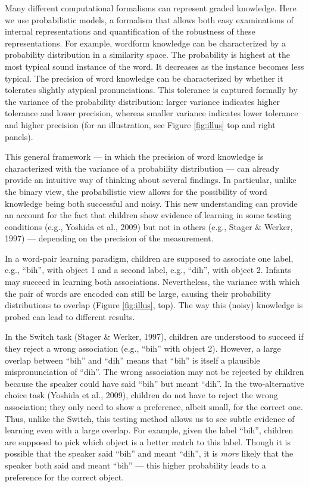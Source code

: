 \documentclass[english,,man]{apa6}
\begin{document}
Many different computational formalisms can represent graded knowledge. Here we use probabilistic models, a formalism that allows both easy examinations of internal representations and quantification of the robustness of these representations. For example, wordform knowledge can be characterized by a probability distribution in a similarity space. The probability is highest at the most typical sound instance of the word. It decreases as the instance becomes less typical. The precision of word knowledge can be characterized by whether it tolerates slightly atypical pronunciations. This tolerance is captured formally by the variance of the probability distribution: larger variance indicates higher tolerance and lower precision, whereas smaller variance indicates lower tolerance and higher precision (for an illustration, see Figure \ref{fig:illus} top and right panels).

This general framework --- in which the precision of word knowledge is characterized with the variance of a probability distribution --- can already provide an intuitive way of thinking about several findings. In particular, unlike the binary view, the probabilistic view allows for the possibility of word knowledge being both successful and noisy. This new understanding can provide an account for the fact that children show evidence of learning in some testing conditions (e.g., Yoshida et al., 2009) but not in others (e.g., Stager \& Werker, 1997) --- depending on the precision of the measurement.

In a word-pair learning paradigm, children are supposed to associate one label, e.g., \enquote{bih}, with object 1 and a second label, e.g., \enquote{dih}, with object 2. Infants may succeed in learning both associations. Nevertheless, the variance with which the pair of words are encoded can still be large, causing their probability distributions to overlap (Figure \ref{fig:illus}, top). The way this (noisy) knowledge is probed can lead to different results.

In the Switch task (Stager \& Werker, 1997), children are understood to succeed if they reject a wrong association (e.g., \enquote{bih} with object 2). However, a large overlap between \enquote{bih} and \enquote{dih} means that \enquote{bih} is itself a plausible mispronunciation of \enquote{dih}. The wrong association may not be rejected by children because the speaker could have said \enquote{bih} but meant \enquote{dih}. In the two-alternative choice task (Yoshida et al., 2009), children do not have to reject the wrong association; they only need to show a preference, albeit small, for the correct one. Thus, unlike the Switch, this testing method allows us to see subtle evidence of learning even with a large overlap. For example, given the label \enquote{bih}, children are supposed to pick which object is a better match to this label. Though it is possible that the speaker said \enquote{bih} and meant \enquote{dih}, it is \emph{more} likely that the speaker both said and meant \enquote{bih} --- this higher probability leads to a preference for the correct object.
\end{document}
